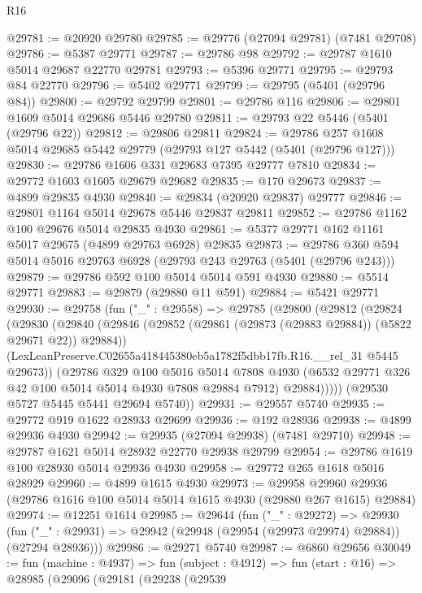 \begin{lexlean}{R16}
\begin{coremodule}
@29781 := @20920 @29780
@29785 := @29776 (@27094 @29781) (@7481 @29708)
@29786 := @5387 @29771
@29787 := @29786 @98
@29792 := @29787 @1610 @5014 @29687 @22770 @29781
@29793 := @5396 @29771
@29795 := @29793 @84 @22770
@29796 := @5402 @29771
@29799 := @29795 (@5401 (@29796 @84))
@29800 := @29792 @29799
@29801 := @29786 @116
@29806 := @29801 @1609 @5014 @29686 @5446 @29780
@29811 := @29793 @22 @5446 (@5401 (@29796 @22))
@29812 := @29806 @29811
@29824 := @29786 @257 @1608 @5014 @29685 @5442 @29779 (@29793 @127 @5442 (@5401 (@29796 @127)))
@29830 := @29786 @1606 @331 @29683 @7395 @29777 @7810
@29834 := @29772 @1603 @1605 @29679 @29682
@29835 := @170 @29673
@29837 := @4899 @29835 @4930
@29840 := @29834 (@20920 @29837) @29777
@29846 := @29801 @1164 @5014 @29678 @5446 @29837 @29811
@29852 := @29786 @1162 @100 @29676 @5014 @29835 @4930
@29861 := @5377 @29771 @162 @1161 @5017 @29675 (@4899 @29763 @6928) @29835
@29873 := @29786 @360 @594 @5014 @5016 @29763 @6928 (@29793 @243 @29763 (@5401 (@29796 @243)))
@29879 := @29786 @592 @100 @5014 @5014 @591 @4930
@29880 := @5514 @29771
@29883 := @29879 (@29880 @11 @591)
@29884 := @5421 @29771
@29930 := @29758
    (fun ("_" : @29558) =>
    @29785
      (@29800
        (@29812
          (@29824
            (@29830
              (@29840
                (@29846 (@29852 (@29861 (@29873 (@29883 @29884)) (@5822 @29671 @22)) @29884))
                (LexLeanPreserve.C02655a418445380eb5a1782f5dbb17fb.R16.__rel_31 @5445 @29673))
              (@29786
                @329
                @100
                @5016
                @5014
                @7808
                @4930
                (@6532 @29771 @326 @42 @100 @5014 @5014 @4930 @7808 @29884 @7912)
                @29884)))))
      (@29530 @5727 @5445 @5441 @29694 @5740))
@29931 := @29557 @5740
@29935 := @29772 @919 @1622 @28933 @29699
@29936 := @192 @28936
@29938 := @4899 @29936 @4930
@29942 := @29935 (@27094 @29938) (@7481 @29710)
@29948 := @29787 @1621 @5014 @28932 @22770 @29938 @29799
@29954 := @29786 @1619 @100 @28930 @5014 @29936 @4930
@29958 := @29772 @265 @1618 @5016 @28929
@29960 := @4899 @1615 @4930
@29973 := @29958
    @29960
    @29936
    (@29786 @1616 @100 @5014 @5014 @1615 @4930 (@29880 @267 @1615) @29884)
@29974 := @12251 @1614
@29985 := @29644
    (fun ("_" : @29272) =>
    @29930 (fun ("_" : @29931) => @29942 (@29948 (@29954 (@29973 @29974) @29884)) (@27294 @28936)))
@29986 := @29271 @5740
@29987 := @6860 @29656
@30049 := fun (machine : @4937) =>
  fun (subject : @4912) =>
  fun (start : @16) =>
  @28985
    (@29096
      (@29181
        (@29238
          (@29539

\end{coremodule}
\end{lexlean}

